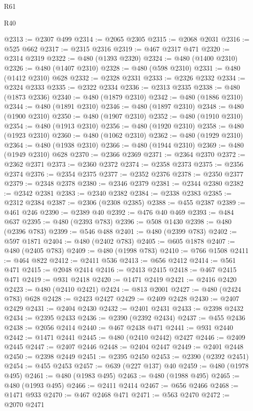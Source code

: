 \begin{lexlean}{R61}
\begin{lexlean}{R40}
\begin{coremodule}
{{{{{{{{{{{{{{{{{{{{{{{{{{{{{{{{{{{{{{{{{{{{{{{{{{{{{{{{{{{{{{{{{{{{{{{{{{{{{{{{{{{{{{{{{{{{{{{{{{{{{{{{{{{{{@2313 := @2307 @499
@2314 := @2065 @2305
@2315 := @2068 @2031
@2316 := @525 @662
@2317 := @2315 @2316
@2319 := @467 @2317 @471
@2320 := @2314 @2319
@2322 := @480 (@1393 @2320)
@2324 := @480 (@1400 @2310)
@2326 := @480 (@1407 @2310)
@2328 := @480 (@598 @2310)
@2331 := @480 (@1412 @2310) @628
@2332 := @2328 @2331
@2333 := @2326 @2332
@2334 := @2324 @2333
@2335 := @2322 @2334
@2336 := @2313 @2335
@2338 := @480 (@1873 @2336)
@2340 := @480 (@1879 @2310)
@2342 := @480 (@1886 @2310)
@2344 := @480 (@1891 @2310)
@2346 := @480 (@1897 @2310)
@2348 := @480 (@1900 @2310)
@2350 := @480 (@1907 @2310)
@2352 := @480 (@1910 @2310)
@2354 := @480 (@1913 @2310)
@2356 := @480 (@1920 @2310)
@2358 := @480 (@1923 @2310)
@2360 := @480 (@1062 @2310)
@2362 := @480 (@1929 @2310)
@2364 := @480 (@1938 @2310)
@2366 := @480 (@1944 @2310)
@2369 := @480 (@1949 @2310) @628
@2370 := @2366 @2369
@2371 := @2364 @2370
@2372 := @2362 @2371
@2373 := @2360 @2372
@2374 := @2358 @2373
@2375 := @2356 @2374
@2376 := @2354 @2375
@2377 := @2352 @2376
@2378 := @2350 @2377
@2379 := @2348 @2378
@2380 := @2346 @2379
@2381 := @2344 @2380
@2382 := @2342 @2381
@2383 := @2340 @2382
@2384 := @2338 @2383
@2385 := @2312 @2384
@2387 := @2306 (@2308 @2385)
@2388 := @455 @2387
@2389 := @461 @246
@2390 := @2389 @40
@2392 := @476 @40 @469
@2393 := @484 @637
@2395 := @480 (@2393 @783)
@2396 := @508 @1430
@2398 := @480 (@2396 @783)
@2399 := @546 @488
@2401 := @480 (@2399 @783)
@2402 := @597 @1871
@2404 := @480 (@2402 @783)
@2405 := @605 @1878
@2407 := @480 (@2405 @783)
@2409 := @480 (@1998 @783)
@2410 := @766 @1508
@2411 := @464 @822
@2412 := @2411 @536
@2413 := @656 @2412
@2414 := @561 @471
@2415 := @2048 @2414
@2416 := @2413 @2415
@2418 := @467 @2415 @471
@2419 := @931 @2418
@2420 := @1471 @2419
@2421 := @2416 @2420
@2423 := @480 (@2410 @2421)
@2424 := @813 @2001
@2427 := @480 (@2424 @783) @628
@2428 := @2423 @2427
@2429 := @2409 @2428
@2430 := @2407 @2429
@2431 := @2404 @2430
@2432 := @2401 @2431
@2433 := @2398 @2432
@2434 := @2395 @2433
@2436 := @2390 (@2392 @2434)
@2437 := @455 @2436
@2438 := @2056 @2414
@2440 := @467 @2438 @471
@2441 := @931 @2440
@2442 := @1471 @2441
@2445 := @480 (@2410 @2442) @2427
@2446 := @2409 @2445
@2447 := @2407 @2446
@2448 := @2404 @2447
@2449 := @2401 @2448
@2450 := @2398 @2449
@2451 := @2395 @2450
@2453 := @2390 (@2392 @2451)
@2454 := @455 @2453
@2457 := @639 (@227 @137) @40
@2459 := @480 (@1978 @495)
@2461 := @480 (@1983 @495)
@2463 := @480 (@1988 @495)
@2465 := @480 (@1993 @495)
@2466 := @2411 @2414
@2467 := @656 @2466
@2468 := @1471 @933
@2470 := @467 @2468 @471
@2471 := @563 @2470
@2472 := @2070 @2471
}}}}}}}}}}}}}}}}}}}}}}}}}}}}}}}}}}}}}}}}}}}}}}}}}}}}}}}}}}}}}}}}}}}}}}}}}}}}}}}}}}}}}}}}}}}}}}}}}}}}}}}}}}}}}
\end{coremodule}
\end{lexlean}
\end{lexlean}
